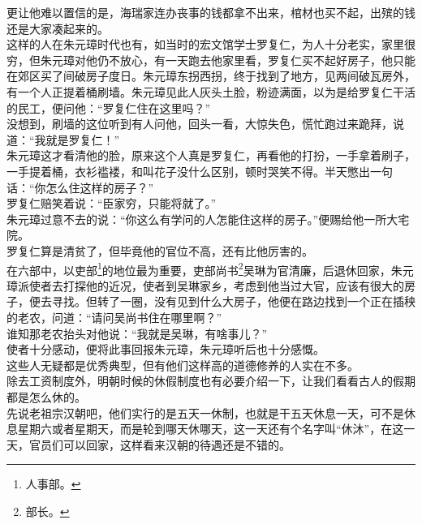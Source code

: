 \begin{multicols}{\theparacolNo}
更让他难以置信的是，海瑞家连办丧事的钱都拿不出来，棺材也买不起，出殡的钱还是大家凑起来的。\\

这样的人在朱元璋时代也有，如当时的宏文馆学士罗复仁，为人十分老实，家里很穷，但朱元璋对他仍不放心，有一天跑去他家里看，罗复仁买不起好房子，他只能在郊区买了间破房子度日。朱元璋东拐西拐，终于找到了地方，见两间破瓦房外，有一个人正提着桶刷墙。朱元璋见此人灰头土脸，粉迹满面，以为是给罗复仁干活的民工，便问他：“罗复仁住在这里吗？”\\

没想到，刷墙的这位听到有人问他，回头一看，大惊失色，慌忙跑过来跪拜，说道：“我就是罗复仁！”\\

朱元璋这才看清他的脸，原来这个人真是罗复仁，再看他的打扮，一手拿着刷子，一手提着桶，衣衫褴褛，和叫花子没什么区别，顿时哭笑不得。半天憋出一句话：“你怎么住这样的房子？”\\

罗复仁赔笑着说：“臣家穷，只能将就了。”\\

朱元璋过意不去的说：“你这么有学问的人怎能住这样的房子。”便赐给他一所大宅院。\\

罗复仁算是清贫了，但毕竟他的官位不高，还有比他厉害的。\\

在六部中，以吏部\footnote{人事部。}的地位最为重要，吏部尚书\footnote{部长。}吴琳为官清廉，后退休回家，朱元璋派使者去打探他的近况，使者到吴琳家乡，考虑到他当过大官，应该有很大的房子，便去寻找。但转了一圈，没有见到什么大房子，他便在路边找到一个正在插秧的老农，问道：“请问吴尚书住在哪里啊？”\\

谁知那老农抬头对他说：“我就是吴琳，有啥事儿？”\\

使者十分感动，便将此事回报朱元璋，朱元璋听后也十分感慨。\\

这些人无疑都是优秀典型，但有他们这样高的道德修养的人实在不多。\\

除去工资制度外，明朝时候的休假制度也有必要介绍一下，让我们看看古人的假期都是怎么休的。\\

先说老祖宗汉朝吧，他们实行的是五天一休制，也就是干五天休息一天，可不是休息星期六或者星期天，而是轮到哪天休哪天，这一天还有个名字叫“休沐”，在这一天，官员们可以回家，这样看来汉朝的待遇还是不错的。\\


\end{multicols}
